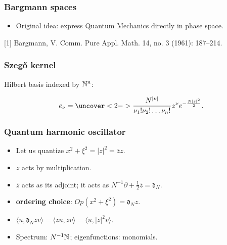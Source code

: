 \documentclass[mathserif]{beamer}
\begin{document}
\begin{frame}
  \frametitle{Bargmann spaces}
  \begin{itemize}
  \item Original idea: express Quantum Mechanics directly in phase
    space.
  \vspace{-2em}
  \end{itemize}
\vspace{-1em}
\small{[1] Bargmann, V. Comm. Pure Appl. Math. 14, no. 3 (1961): 187–214.}

\end{frame}

\begin{frame}
  \frametitle{Szeg\H{o} kernel}
  Hilbert basis indexed by $\mathbb{N}^{n}$:

$$e_{\nu}=\uncover<2->{\cfrac{N^{|\nu|}}{\nu_1!\nu_2!\ldots\nu_n!}}\,z^{\nu}e^{-\frac{N|z|^2}{2}}.$$

\end{frame}

\begin{frame}
  \frametitle{Quantum harmonic oscillator}
  \begin{itemize}
  \item Let us quantize $x^2+\xi^2=|z|^2=\overline{z}z$.
  \item<2-> $z$ acts by multiplication.
  \item<3-> $\overline{z}$ acts as its adjoint; it acts as
    $N^{-1}\partial+\frac 12 \overline{z}=\mathfrak{d}_N$.
  \item<4-> {\bf ordering choice}: $Op(x^2+\xi^2)=\mathfrak{d}_Nz$.
  \item<5-> $\langle u,\mathfrak{d}_Nzv\rangle=\langle
    zu,zv\rangle=\langle u,|z|^2v\rangle$.
  \item<6> Spectrum: $N^{-1}\mathbb{N}$; eigenfunctions: monomials. 
  \end{itemize}
\end{frame}
\end{document}
